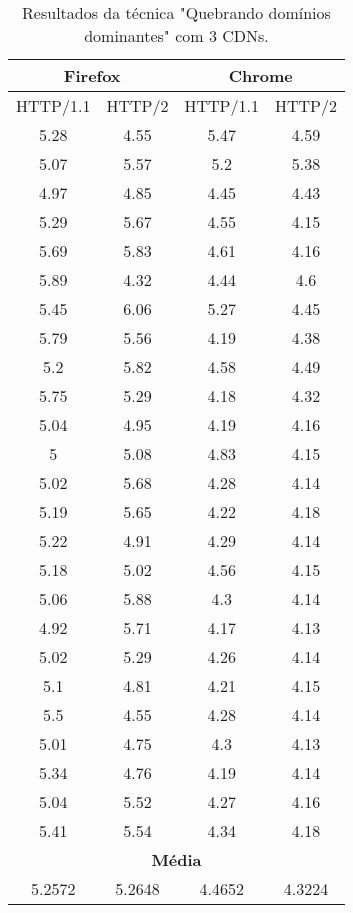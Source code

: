 \begin{table}[h]
	\centering
	\caption{Resultados da técnica "Quebrando domínios dominantes" com 3 CDNs.}
	\label{resultados-quebrandodominiosdominantes-3}
	\begin{tabular}{cccc}
		\hline
		\multicolumn{2}{c}{\textbf{Firefox}} & \multicolumn{2}{c}{\textbf{Chrome}} \\
		\hline
		HTTP/1.1 & HTTP/2 & HTTP/1.1 & HTTP/2 \\
		\hline
		5.28 & 4.55 & 5.47 & 4.59 \\
		5.07 & 5.57 & 5.2 & 5.38 \\
		4.97 & 4.85 & 4.45 & 4.43 \\
		5.29 & 5.67 & 4.55 & 4.15 \\
		5.69 & 5.83 & 4.61 & 4.16 \\
		5.89 & 4.32 & 4.44 & 4.6 \\
		5.45 & 6.06 & 5.27 & 4.45 \\
		5.79 & 5.56 & 4.19 & 4.38 \\
		5.2 & 5.82 & 4.58 & 4.49 \\
		5.75 & 5.29 & 4.18 & 4.32 \\
		5.04 & 4.95 & 4.19 & 4.16 \\
		5 & 5.08 & 4.83 & 4.15 \\
		5.02 & 5.68 & 4.28 & 4.14 \\
		5.19 & 5.65 & 4.22 & 4.18 \\
		5.22 & 4.91 & 4.29 & 4.14 \\
		5.18 & 5.02 & 4.56 & 4.15 \\
		5.06 & 5.88 & 4.3 & 4.14 \\
		4.92 & 5.71 & 4.17 & 4.13 \\
		5.02 & 5.29 & 4.26 & 4.14 \\
		5.1 & 4.81 & 4.21 & 4.15 \\
		5.5 & 4.55 & 4.28 & 4.14 \\
		5.01 & 4.75 & 4.3 & 4.13 \\
		5.34 & 4.76 & 4.19 & 4.14 \\
		5.04 & 5.52 & 4.27 & 4.16 \\
		5.41 & 5.54 & 4.34 & 4.18 \\
		\hline
		\multicolumn{4}{c}{\textbf{Média}} \\
		5.2572 & 5.2648 & 4.4652 & 4.3224 \\
		\hline
	\end{tabular}
\end{table}